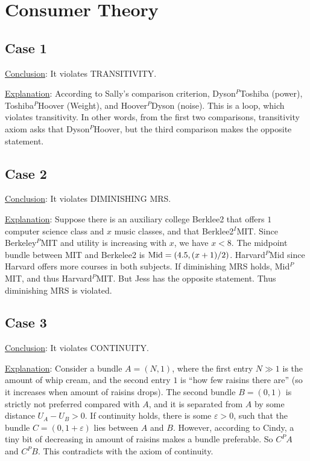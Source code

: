\documentclass{article}
\begin{document}
\section{Consumer Theory}
\subsection{Case 1}
\noindent\underline{Conclusion}: It violates TRANSITIVITY.

\noindent\underline{Explanation}: According to Sally's comparison criterion, Dyson$^P$Toshiba (power), Toshiba$^P$Hoover (Weight), and Hoover$^P$Dyson (noise). This is a loop, which violates transitivity. In other words, from the first two comparisons, transitivity axiom asks that Dyson$^P$Hoover, but the third comparison makes the opposite statement.

\subsection{Case 2}
\noindent\underline{Conclusion}: It violates DIMINISHING MRS.

\noindent\underline{Explanation}: Suppose there is an auxiliary college Berklee2 that offers $1$ computer science class and $x$ music classes, and that Berklee2$^I$MIT. Since Berkeley$^P$MIT and utility is increasing with $x$, we have $x<8$. The midpoint bundle between MIT and Berkelee2 is $\textup{Mid}=(4.5,(x+1)/2)$. Harvard$^P$Mid since Harvard offers more courses in both subjects. If diminishing MRS holds, Mid$^P$MIT, and thus Harvard$^P$MIT. But Jess has the opposite statement. Thus diminishing MRS is violated.

\subsection{Case 3}
\noindent\underline{Conclusion}: It violates CONTINUITY.

\noindent\underline{Explanation}: 
Consider a bundle $A=(N,1)$, where the first entry $N\gg1$ is the amount of whip cream, and the second entry $1$ is ``how few raisins there are'' (so it increases when amount of raisins drops). The second bundle $B=(0,1)$ is strictly not preferred compared with $A$, and it is separated from $A$ by some distance $U_A-U_B>0$. If continuity holds, there is some $\varepsilon>0$, such that the bundle $C=(0,1+\varepsilon)$ lies between $A$ and $B$. However, according to Cindy, a tiny bit of decreasing in amount of raisins makes a bundle preferable. So $C^PA$ and $C^PB$. This contradicts with the axiom of continuity.
\end{document}

